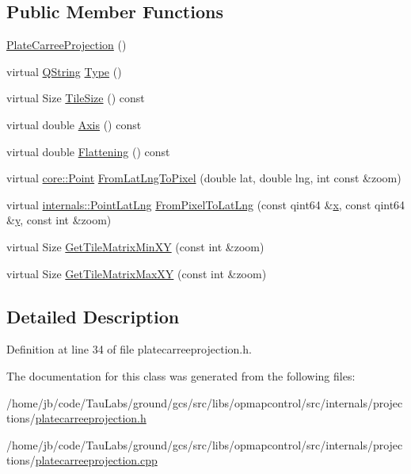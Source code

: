 \subsection*{\-Public \-Member \-Functions}
\begin{DoxyCompactItemize}
\item 
\hyperlink{group___o_p_map_widget_ga931c372d511eb5f902be68e721dea1a1}{\-Plate\-Carree\-Projection} ()
\item 
virtual \hyperlink{group___u_a_v_objects_plugin_gab9d252f49c333c94a72f97ce3105a32d}{\-Q\-String} \hyperlink{group___o_p_map_widget_ga71ab3c89676e92a088c8ac2ce4058142}{\-Type} ()
\item 
virtual \-Size \hyperlink{group___o_p_map_widget_gacf9afa88981c6504040c08c19731ea98}{\-Tile\-Size} () const 
\item 
virtual double \hyperlink{group___o_p_map_widget_ga0917ee78fdc28e179792601c612072e9}{\-Axis} () const 
\item 
virtual double \hyperlink{group___o_p_map_widget_ga9826466bb3f7ed3e3bd1f3a5b8a538d5}{\-Flattening} () const 
\item 
virtual \hyperlink{structcore_1_1_point}{core\-::\-Point} \hyperlink{group___o_p_map_widget_ga36e2342a818ea95326dc2100e9f39460}{\-From\-Lat\-Lng\-To\-Pixel} (double lat, double lng, int const \&zoom)
\item 
virtual \hyperlink{structinternals_1_1_point_lat_lng}{internals\-::\-Point\-Lat\-Lng} \hyperlink{group___o_p_map_widget_gadd2ce1ff11cbb8b8704013b12cf8865f}{\-From\-Pixel\-To\-Lat\-Lng} (const qint64 \&\hyperlink{_o_p_plots_8m_a9336ebf25087d91c818ee6e9ec29f8c1}{x}, const qint64 \&\hyperlink{_o_p_plots_8m_a2fb1c5cf58867b5bbc9a1b145a86f3a0}{y}, const int \&zoom)
\item 
virtual \-Size \hyperlink{group___o_p_map_widget_ga5e7a2f9214e18785a5c7c87321caea12}{\-Get\-Tile\-Matrix\-Min\-X\-Y} (const int \&zoom)
\item 
virtual \-Size \hyperlink{group___o_p_map_widget_ga8523592554481d4a42f407d160ade5cd}{\-Get\-Tile\-Matrix\-Max\-X\-Y} (const int \&zoom)
\end{DoxyCompactItemize}


\subsection{\-Detailed \-Description}


\-Definition at line 34 of file platecarreeprojection.\-h.



\-The documentation for this class was generated from the following files\-:\begin{DoxyCompactItemize}
\item 
/home/jb/code/\-Tau\-Labs/ground/gcs/src/libs/opmapcontrol/src/internals/projections/\hyperlink{platecarreeprojection_8h}{platecarreeprojection.\-h}\item 
/home/jb/code/\-Tau\-Labs/ground/gcs/src/libs/opmapcontrol/src/internals/projections/\hyperlink{platecarreeprojection_8cpp}{platecarreeprojection.\-cpp}\end{DoxyCompactItemize}

